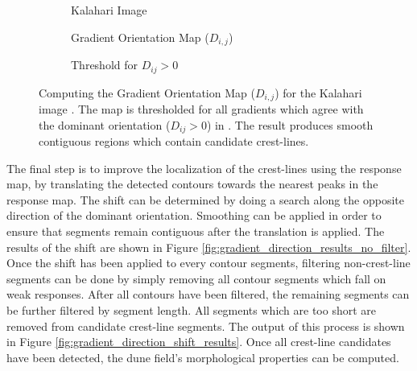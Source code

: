 \begin{figure}
	\centering
	\begin{subfigure}{0.48\textwidth}
		\centering
		\caption{Kalahari Image}
		\label{fig:gradient_orientation_kalahari_input}
	\end{subfigure}
	\begin{subfigure}{0.48\textwidth}
		\centering
		\caption{ Gradient Orientation Map ($D_{i,j}$) }
		\label{fig:gradient_orientation_map_kalahari}
	\end{subfigure}
	\begin{subfigure}{0.8\textwidth}
		\centering
		\caption{ Threshold for $D_{ij} > 0$ }
		\label{fig:threshold_gradient_orientation_map_kalahari}
	\end{subfigure}
	\caption{ Computing the Gradient Orientation Map  ($D_{i,j}$) for the Kalahari image . The map is thresholded for all gradients which agree with the dominant orientation ($D_{ij} > 0$) in . The result produces smooth contiguous regions which contain candidate crest-lines. }
	\label{fig:gradient_orientation_map}
\end{figure}

The final step is to improve the localization of the crest-lines using the response map, by translating the detected contours towards the nearest peaks in the response map. The shift can be determined by doing a search along the opposite direction of the dominant orientation. Smoothing can be applied in order to ensure that segments remain contiguous after the translation is applied. The results of the shift are shown in Figure \ref{fig:gradient_direction_results_no_filter}. Once the shift has been applied to every contour segments, filtering non-crest-line segments can be done by simply removing all contour segments which fall on weak responses. After all contours have been filtered, the remaining segments can be further filtered by segment length. All segments which are too short are removed from candidate crest-line segments. The output of this process is shown in Figure \ref{fig:gradient_direction_shift_results}. Once all crest-line candidates have been detected, the dune field's morphological properties can be computed.

